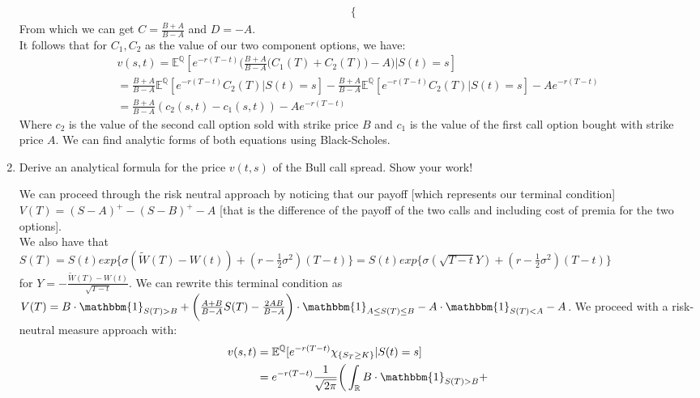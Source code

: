 \documentclass[12pt,twoside, letter]{exam}
\theoremstyle{definition}
\newcommand{\rr}{\mathbb{R}}
\newcommand{\ee}{\mathbb{E}}
\newcommand{\id}{\mathbbm{1}}
\begin{document}
\begin{enumerate}
\begin{solution}
\begin{align*}
\begin{cases}
              \end{cases}
            \end{align*}
            From which we can get $C = \frac{B+A}{B-A}$ and $D = -A$. \\
            It follows that for $C_1, C_2$ as the value of our two component options, we have:
            \begin{align*}
              v(s,t) = \ee^{\mathbb{Q}}[e^{-r(T-t)}\bigg(\frac{B+A}{B-A}\big(C_1(T) + C_2(T)\big)-A\bigg) | S(t) = s] \\
              = \frac{B+A}{B-A}\ee^{\mathbb{Q}}[e^{-r(T-t)}C_2(T) | S(t) = s] - \frac{B+A}{B-A}\ee^{\mathbb{Q}}[e^{-r(T-t)}C_2(T) | S(t) = s] - Ae^{-r(T-t)}\\
              = \frac{B+A}{B-A}(c_2(s,t) - c_1(s,t)) - Ae^{-r(T-t)}
            \end{align*}
            Where $c_2$ is the value of the second call option sold with strike price $B$ and $c_1$ is the value of the first call option
            bought with strike price $A$. We can find analytic forms of both equations using Black-Scholes.
        \end{solution}
      \item Derive an analytical formula for the price $v(t,s)$ of the Bull call spread. Show your work!
        \begin{solution}
          We can proceed through the risk neutral approach by noticing that our payoff [which represents our terminal condition] $V(T) = (S - A)^+ - (S - B)^+ -A$
          [that is the difference of the payoff of the two calls and including cost of premia for the two options].\\
          We also have that $S(T) = S(t)exp\{\sigma(\tilde{W}(T) - W(t)) + (r- \frac{1}{2}\sigma^2)(T-t)\}
          = S(t)exp\{\sigma(\sqrt{T-t}Y) + (r- \frac{1}{2}\sigma^2)(T-t)\}$ \\
          for $Y = -\frac{\tilde{W}(T)-W(t)}{\sqrt{T-t}}$.
          We can rewrite this terminal condition as $V(T) = B \cdot \id_{S(T) > B} + \bigg(\frac{A+B}{B-A}S(T) - \frac{2AB}{B-A}\bigg)\cdot \id_{A \leq S(T) \leq B}
          - A \cdot \id_{S(T) < A} - A$. We proceed with a risk-neutral measure approach with:
          \begin{align*}
            v(s,t) &= \ee^{\mathbb{Q}}[e^{-r(T-t)}\chi_{\{S_T \geq K \}} | S(t) = s] \\
            &= e^{-r(T-t)}\frac{1}{\sqrt{2\pi}}\bigg(\int_{\rr} B \cdot \id_{S(T) > B} + \\

\end{align*}
\end{solution}
\end{enumerate}
\end{document}
